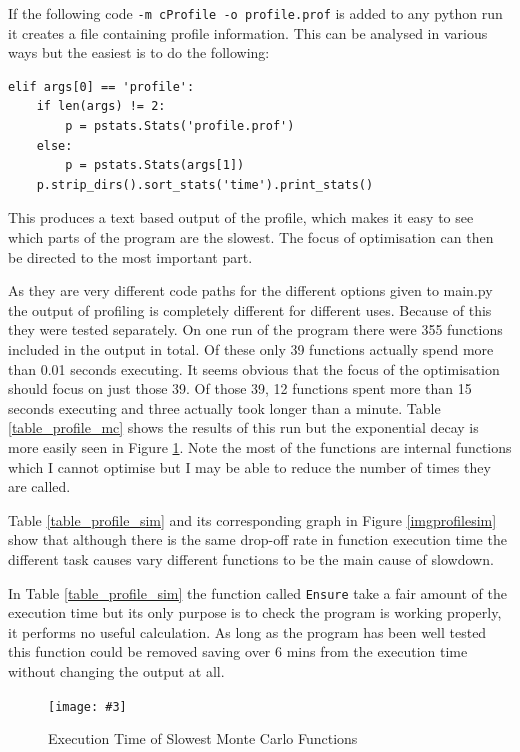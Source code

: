 \documentclass[a4paper,oneside,12pt]{report}
\newcommand{\image}[3] {
  \begin{figure}
    \begin{center}
      \texttt{[image: \#3]}
      \caption{#2}
      \label{#1}
    \end{center}
  \end{figure}
}
\begin{document}
If the following code \texttt{-m cProfile -o profile.prof} is added to
any python run it creates a file containing profile information. This can
be analysed in various ways but the easiest is to do the following:

\begin{verbatim}
elif args[0] == 'profile':
    if len(args) != 2:
        p = pstats.Stats('profile.prof')
    else:
        p = pstats.Stats(args[1])
    p.strip_dirs().sort_stats('time').print_stats()
\end{verbatim}

This produces a text based output of the profile, which makes it easy to
see which parts of the program are the slowest. The focus of
optimisation can then be directed to the most important part.

As they are very different code paths for the different options given to main.py the output of profiling is completely different for different uses. Because of this they were tested separately. On one run of the program there were 355 functions included in the output in total. Of these only 39 functions actually spend more than 0.01 seconds executing. It seems obvious that the focus of the optimisation should focus on just those 39. Of those 39, 12 functions spent more than 15 seconds executing and three actually took longer than a minute. Table \ref{table_profile_mc} shows the results of this run but the exponential decay is more easily seen in Figure \ref{imgprofilemc}. Note the most of the functions are internal functions which I cannot optimise but I may be able to reduce the number of times they are called.

Table \ref{table_profile_sim} and its corresponding graph in Figure \ref{imgprofilesim} show that although there is the same drop-off rate in function execution time the different task causes vary different functions to be the main cause of slowdown. 

In Table \ref{table_profile_sim} the function called \texttt{Ensure} take a fair amount of the execution time but its only purpose is to check the program is working properly, it performs no useful calculation. As long as the program has been well tested this function could be removed saving over 6 mins from the execution time without changing the output at all.

\image{imgprofilemc}{Execution Time of Slowest Monte Carlo Functions}{profile.png}
\end{document}

